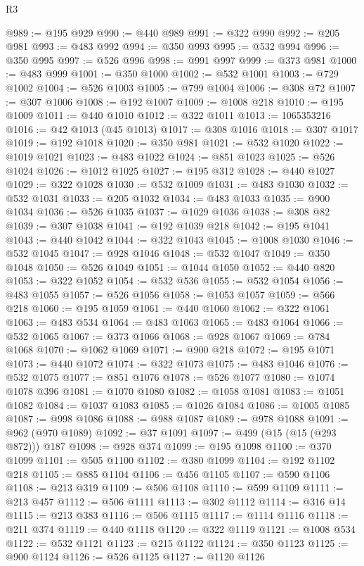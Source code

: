 \begin{lexlean}{R3}
\begin{coremodule}
@989 := @195 @929
@990 := @440 @989
@991 := @322 @990
@992 := @205 @981
@993 := @483 @992
@994 := @350 @993
@995 := @532 @994
@996 := @350 @995
@997 := @526 @996
@998 := @991 @997
@999 := @373 @981
@1000 := @483 @999
@1001 := @350 @1000
@1002 := @532 @1001
@1003 := @729 @1002
@1004 := @526 @1003
@1005 := @799 @1004
@1006 := @308 @72
@1007 := @307 @1006
@1008 := @192 @1007
@1009 := @1008 @218
@1010 := @195 @1009
@1011 := @440 @1010
@1012 := @322 @1011
@1013 := 1065353216
@1016 := @42 @1013 (@45 @1013)
@1017 := @308 @1016
@1018 := @307 @1017
@1019 := @192 @1018
@1020 := @350 @981
@1021 := @532 @1020
@1022 := @1019 @1021
@1023 := @483 @1022
@1024 := @851 @1023
@1025 := @526 @1024
@1026 := @1012 @1025
@1027 := @195 @312
@1028 := @440 @1027
@1029 := @322 @1028
@1030 := @532 @1009
@1031 := @483 @1030
@1032 := @532 @1031
@1033 := @205 @1032
@1034 := @483 @1033
@1035 := @900 @1034
@1036 := @526 @1035
@1037 := @1029 @1036
@1038 := @308 @82
@1039 := @307 @1038
@1041 := @192 @1039 @218
@1042 := @195 @1041
@1043 := @440 @1042
@1044 := @322 @1043
@1045 := @1008 @1030
@1046 := @532 @1045
@1047 := @928 @1046
@1048 := @532 @1047
@1049 := @350 @1048
@1050 := @526 @1049
@1051 := @1044 @1050
@1052 := @440 @820
@1053 := @322 @1052
@1054 := @532 @536
@1055 := @532 @1054
@1056 := @483 @1055
@1057 := @526 @1056
@1058 := @1053 @1057
@1059 := @566 @218
@1060 := @195 @1059
@1061 := @440 @1060
@1062 := @322 @1061
@1063 := @483 @534
@1064 := @483 @1063
@1065 := @483 @1064
@1066 := @532 @1065
@1067 := @373 @1066
@1068 := @928 @1067
@1069 := @784 @1068
@1070 := @1062 @1069
@1071 := @900 @218
@1072 := @195 @1071
@1073 := @440 @1072
@1074 := @322 @1073
@1075 := @483 @1046
@1076 := @532 @1075
@1077 := @851 @1076
@1078 := @526 @1077
@1080 := @1074 @1078 @396
@1081 := @1070 @1080
@1082 := @1058 @1081
@1083 := @1051 @1082
@1084 := @1037 @1083
@1085 := @1026 @1084
@1086 := @1005 @1085
@1087 := @998 @1086
@1088 := @988 @1087
@1089 := @978 @1088
@1091 := @962 (@970 @1089)
@1092 := @37 @1091
@1097 := @499 (@15 (@15 (@293 @872))) @187
@1098 := @928 @374
@1099 := @195 @1098
@1100 := @370 @1099
@1101 := @505 @1100
@1102 := @380 @1099
@1104 := @192 @1102 @218
@1105 := @885 @1104
@1106 := @456 @1105
@1107 := @590 @1106
@1108 := @213 @319
@1109 := @506 @1108
@1110 := @599 @1109
@1111 := @213 @457
@1112 := @506 @1111
@1113 := @302 @1112
@1114 := @316 @14
@1115 := @213 @383
@1116 := @506 @1115
@1117 := @1114 @1116
@1118 := @211 @374
@1119 := @440 @1118
@1120 := @322 @1119
@1121 := @1008 @534
@1122 := @532 @1121
@1123 := @215 @1122
@1124 := @350 @1123
@1125 := @900 @1124
@1126 := @526 @1125
@1127 := @1120 @1126

\end{coremodule}
\end{lexlean}

